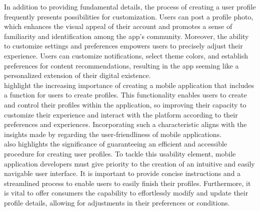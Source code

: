 In addition to providing fundamental details, the process of creating a user profile frequently presents possibilities for customization. Users can post a profile photo, which enhances the visual appeal of their account and promotes a sense of familiarity and identification among the app's community. Moreover, the ability to customize settings and preferences empowers users to precisely adjust their experience. Users can customize notifications, select theme colors, and establish preferences for content recommendations, resulting in the app seeming like a personalized extension of their digital existence. \\

\textcite{abdulrahman22} highlight the increasing importance of creating a mobile application that includes a function for users to create profiles. This functionality enables users to create and control their profiles within the application, so improving their capacity to customize their experience and interact with the platform according to their preferences and experiences. Incorporating such a characteristic aligns with the insights made by \textcite{weichbroth20} regarding the user-friendliness of mobile applications. \\

\textcite{weichbroth20} also highlights the significance of guaranteeing an efficient and accessible procedure for creating user profiles. To tackle this usability element, mobile application developers must give priority to the creation of an intuitive and easily navigable user interface. It is important to provide concise instructions and a streamlined process to enable users to easily finish their profiles. Furthermore, it is vital to offer consumers the capability to effortlessly modify and update their profile details, allowing for adjustments in their preferences or conditions. \pagebreak

